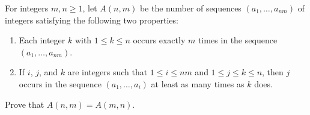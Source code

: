 For integers $m,n\geq1$, let $A(n,m)$ be the number of sequences $(a_1,\ldots,a_{nm})$ of integers satisfying the following two properties:
\begin{enumerate}[label=(\alph*)]
	\item Each integer $k$ with $1\leq k\leq n$ occurs exactly $m$ times in the sequence $(a_1,\ldots,a_{nm})$.
	\item If $i$, $j$, and $k$ are integers such that $1\leq i\leq nm$ and $1\leq j\leq k\leq n$, then $j$ occurs in the sequence $(a_1,\ldots,a_i)$ at least as many times as $k$ does.
\end{enumerate}
Prove that $A(n,m)=A(m,n)$.